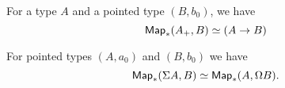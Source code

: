 \documentclass[hott-all.tex]{subfiles}
\begin{document}
% 
\begin{lem}
  For a type $A$ and a pointed type $(B,b_0)$, we have
  \[ \mathsf{Map}_*(A_+,B) \simeq (A\to B) \]
\end{lem}
% 
%
% 
\begin{lem}
  For pointed types $(A,a_0)$ and $(B,b_0)$ we have
  \[ \mathsf{Map}_*(\Sigma A, B) \simeq \mathsf{Map}_*(A,\Omega B).\]
\end{lem}
\end{document}
